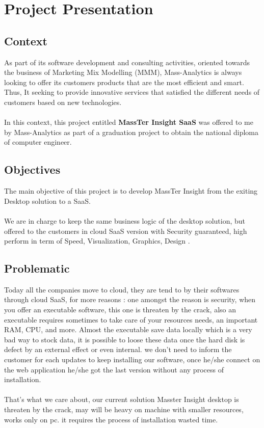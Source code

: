 \documentclass[12pt]{article}
\begin{document}
	\section{Project Presentation}
	
	\subsection{Context}
	As part of its software development and consulting activities, oriented towards the business of Marketing Mix Modelling (MMM), Mass-Analytics is always looking to offer its customers products that are the most efficient and smart. Thus, It seeking to provide innovative services that satisfied the different needs of customers based on new technologies.
	\\
	\\
	In this context, this project entitled \textbf{MassTer Insight SaaS} was offered to me by Mass-Analytics as part of a graduation project to obtain the national diploma of computer engineer.      
	\subsection{Objectives}
	The main objective of this project is to develop MassTer Insight from the exiting Desktop solution to a SaaS.
	\\
	\\
	We are in charge to keep the same business logic of the desktop solution, but offered to the customers in cloud SaaS version with Security guaranteed,  high perform in term of Speed, Visualization, Graphics, Design .
	\subsection{Problematic}
	Today all the companies move to cloud, they are tend to by their softwares through cloud SaaS, for more reasons : one amongst the reason is security, when you offer an executable software, this one is threaten by the crack, also an executable requires sometimes to take care of your resources needs, an important RAM, CPU, and more. Almost the executable save data locally which is a very bad way to stock data, it is possible to loose these data once the hard disk is defect by an external effect or even internal. we don't need to inform the customer for each updates to keep installing our software, once he/she connect on the web application he/she got the last version without any process of installation.  
	\\
	\\
	That's what we care about, our current solution Masster Insight desktop is threaten by the crack, may will be heavy on machine with smaller resources, works only on pc. it requires the process of installation wasted time.
\end{document}
